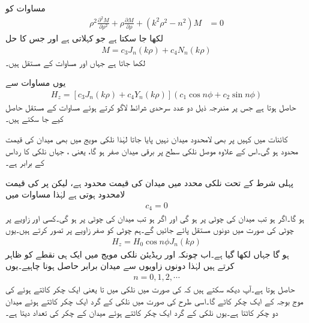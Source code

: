 مساوات  کو
\begin{align}
\rho^2 \frac{\partial^2 M}{\partial \rho^2} +\rho \frac{\partial M}{\partial \rho} +(k^2 \rho^2-n^2)M &=0
\end{align}
لکھا جا سکتا ہے جو  کہلاتی ہے اور جس کا حل
\begin{align}
M=c_3 J_n(k \rho)+c_4 N_n(k\rho)
\end{align}
لکھا جاتا ہے جہاں  اور  مساوات کے مستقل ہیں۔

یوں مساوات  سے
\begin{align}\label{مساوات_مویج_نلکی_حل_الف}
H_z=\left[c_3 J_n(k \rho)+c_4 Y_n(k\rho)\right]\left(c_1 \cos n \phi +c_2 \sin n \phi\right)
\end{align}
حاصل ہوتا ہے جس پر مندرجہ ذیل دو عدد سرحدی شرائط لاگو کرتے ہوئے مساوات کے مستقل حاصل کیے جا سکتے ہیں۔

کائنات میں کہیں پر بھی لامحدود میدان نہیں پایا جاتا لہٰذا نلکی مویج میں بھی میدان کی قیمت محدود ہو گی۔اس کے علاوہ موصل نلکی سطح پر برقی میدان صفر
 ہو گا، یعنی ، جہاں نلکی کا رداس  کے برابر ہے۔

 پہلی شرط کے تحت نلکی محدد میں میدان کی قیمت محدود ہے، لیکن  پر  کی قیمت لامحدود ہوتی ہے لہٰذا مساوات  میں 
\begin{align}
c_4=0
\end{align}   
ہو گا۔اگر  ہو تب میدان کی چوٹی  پر ہو گی  اور اگر  ہو تب میدان کی چوٹی  پر ہو گی۔کسی اور زاویے پر چوٹی کی صورت میں دونوں مستقل پائے جائیں گے۔ہم چوٹی کو صفر زاویے پر تصور کرتے ہیں۔یوں
\begin{align}\label{مساوات_مویج_نلکی_حل_ب}
H_z=H_0  \cos n \phi  J_n(k \rho)
\end{align}
ہو گا جہاں  لکھا گیا ہے۔اب چونکہ  اور  ریڈیئن نلکی مویج میں ایک ہی نقطے کو ظاہر کرتے ہیں لہٰذا دونوں زاویوں سے میدان برابر حاصل ہونا چاہیے۔یوں
\begin{align*}
n=0,1,2,\cdots
\end{align*}
حاصل ہوتا ہے۔آپ دیکھ سکتے ہیں کہ  کی صورت میں نلکی میں  تا  یعنی ایک چکر کاٹتے ہوئے   کی موج بوجہ  کے ایک چکر کاٹے گا۔اسی طرح  کی صورت میں نلکی کے گرد ایک چکر کاٹتے ہوئے میدان دو چکر کاٹتا ہے۔یوں نلکی کے گرد ایک چکر کاٹتے ہوئے میدان کے چکر کی تعداد  دیتا ہے۔

